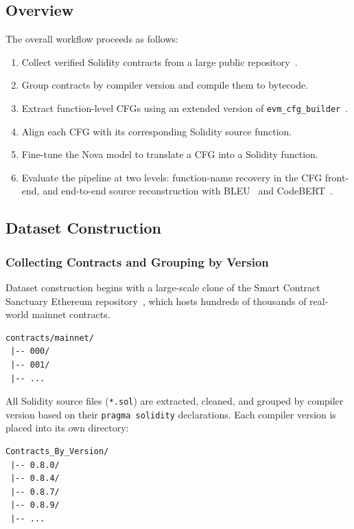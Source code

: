 \documentclass{article}
\begin{document}
\subsection{Overview}

The overall workflow proceeds as follows:

\begin{enumerate}
    \item Collect verified Solidity contracts from a large public
          repository~\cite{smart_contract_sanctuary}.
    \item Group contracts by compiler version and compile them to bytecode.
    \item Extract function-level CFGs using an extended version of
          \texttt{evm\_cfg\_builder}~\cite{evm_cfg_builder}.
    \item Align each CFG with its corresponding Solidity source function.
    \item Fine-tune the Nova model to translate a CFG into a Solidity function.
    \item Evaluate the pipeline at two levels: function-name recovery in the CFG
          front-end, and end-to-end source reconstruction with
          BLEU~\cite{papineni2002bleu} and CodeBERT~\cite{feng2020codebert}.
\end{enumerate}

\subsection{Dataset Construction}

\subsubsection{Collecting Contracts and Grouping by Version}

Dataset construction begins with a large-scale clone of the Smart Contract
Sanctuary Ethereum repository~\cite{smart_contract_sanctuary}, which hosts hundreds
of thousands of real-world mainnet contracts.

\begin{verbatim}
contracts/mainnet/
 |-- 000/
 |-- 001/
 |-- ...
\end{verbatim}

All Solidity source files (\texttt{*.sol}) are extracted, cleaned, and grouped by
compiler version based on their \texttt{pragma solidity} declarations. Each
compiler version is placed into its own directory:

\begin{verbatim}
Contracts_By_Version/
 |-- 0.8.0/
 |-- 0.8.4/
 |-- 0.8.7/
 |-- 0.8.9/
 |-- ...
\end{verbatim}
\end{document}
